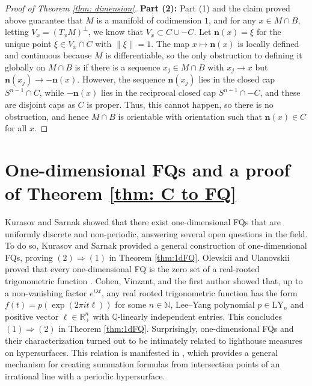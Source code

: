 \documentclass[11pt,letterpaper]{amsart}
\theoremstyle{definition}
\theoremstyle{plain}
\newcommand{\nfield}{\mathbf n}
\newcommand{\R}{{\mathbb R}}
\newcommand{\Q}{{\mathbb Q}}
\newcommand{\N}{{\mathbb N}}
\begin{document}
\begin{proof}[Proof of Theorem \ref{thm: dimension}]
\textbf{Part (2):} Part (1) and the claim proved above guarantee that $M$ is a manifold of codimension $1$, and for any $x\in M\cap B$, letting $V_x=(T_{x}M)^{\perp}$, we know that $V_{x}\subset C\cup-C$. Let $\nfield(x)=\xi$ for the unique point $\xi\in V_{x}\cap C$ with $\|\xi\|=1$. The map $x\mapsto \nfield(x)$ is locally defined and continuous because $M$ is differentiable, so the only obstruction to defining it globally on $M\cap B$ is if there is a sequence $x_j\in M\cap B$ with $x_{j}\to x$ but $\nfield(x_j)\to -\nfield(x)$. However, the sequence $\nfield(x_j)$ lies in the closed cap $S^{n-1}\cap C$, while $-\nfield(x)$ lies in the reciprocal closed cap $S^{n-1}\cap -C$, and these are disjoint caps as $C$ is proper. Thus, this cannot happen, so there is no obstruction, and hence $M\cap B$ is orientable with orientation such that $\nfield(x)\in C$ for all $x$.
\end{proof}

\section{One-dimensional FQs and a proof of Theorem \ref{thm: C to FQ}}\label{sec: FQ}
Kurasov and Sarnak \cite{kurasovsarnak} showed that there exist one-dimensional FQs that are uniformly discrete and non-periodic, answering several open questions in the field. To do so, Kurasov and Sarnak provided a general construction of one-dimensional FQs, proving $(2)\Rightarrow(1)$ in Theorem \ref{thm:1dFQ}. Olevskii and Ulanovskii proved that every one-dimensional FQ is the zero set of a real-rooted trigonometric function \cite{olevskii2020fourier}. Cohen, Vinzant, and the first author showed that, up to a non-vanishing factor $e^{i\lambda t}$, any real rooted trigonometric function has the form $f(t)=p(\exp(2\pi it\ell))$ for some $n\in\N$, Lee--Yang polynomial $p\in\mathrm{LY}_{n}$ and positive vector $\ell\in\R^{n}_{+}$ with $\Q$-linearly independent entries. This concludes $(1)\Rightarrow(2)$ in Theorem \ref{thm:1dFQ}. 
Surprisingly, one-dimensional FQs and their characterization turned out to be intimately related to lighthouse measures on hypersurfaces. This relation is manifested in , which provides a general mechanism for creating summation formulas from intersection points of an irrational line with a periodic hypersurface. 
\end{document}
